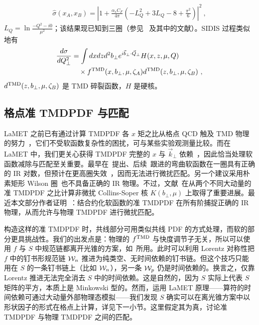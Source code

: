 \begin{align}
	\hat \sigma(x_A,x_B)=\left|1+\frac{\alpha_sC_F}{4\pi}\left(-L^2_{Q}+3L_Q-8+\frac{\pi^2}{6}\right)\right|^2 \ ,
\end{align}
$L_Q=\ln \frac{-Q^2-i0}{\mu^2}$；该结果现已知到三圈（参见~\cite{Moch:2005tm,Baikov:2009bg,Lee:2010cga,Gehrmann:2010ue} 及其中的文献）。SIDIS 过程类似地有
\begin{align}
	\frac{d\sigma}{dQ_\perp^2}&=\int dxdz d^2b_\perp e^{i\vec{b}_\perp \cdot \vec{Q}_\perp}H(x,z,\mu,Q)\nonumber \\
	&\quad \times f^{\rm TMD}(x,b_\perp,\mu,\zeta_A)d^{\rm TMD}(z,b_\perp,\mu,\zeta_B) \ ,
\end{align}
$d^{\rm TMD}(z,b_\perp,\mu,\zeta_B)$ 是 TMD 碎裂函数，$H$ 是硬核。



\subsection{格点准 TMDPDF 与匹配}
\label{sec:quasitmd}
LaMET 之前已有通过计算 TMDPDF 各 $x$ 矩之比从格点 QCD 触及 TMD 物理的努力~\cite{Hagler:2009mb,Musch:2010ka,Musch:2011er,Engelhardt:2015xja,Yoon:2017qzo}，它们不受软函数复杂性的困扰，可与某些实验观测量比较。而在 LaMET 中，我们更关心获得 TMDPDF 完整的 $x$ 与 $\vec{k}_\perp$ 依赖~\cite{Ji:2014hxa,Ji:2018hvs,Ebert:2018gzl,Ebert:2019okf,Ji:2019sxk,Ji:2019ewn}，因此恰当处理软函数减除与匹配至关重要。最早在~\cite{Ji:2014hxa}提出、后续~\cite{Ebert:2019okf}跟进的弯曲软函数在一圈具有正确的 IR 对数，但预计在更高圈失效~\cite{Ji:2019sxk}，因而无法进行微扰匹配。另一个建议采用朴素矩形 Wilson 圈~\cite{Ji:2018hvs,Ebert:2019okf}也不具备正确的 IR 物理。不过，文献~\cite{Ebert:2018gzl}在从两个不同大动量的准 TMDPDF 之比计算非微扰 Collins-Soper 核 $K(b_\perp,\mu)$ 上取得了重要进展。最近本文部分作者证明~\cite{Ji:2019sxk,Ji:2019ewn}：结合约化软函数的准 TMDPDF 在所有阶捕捉正确的 IR 物理，从而允许与物理 TMDPDF 进行微扰匹配。

构造这样的准 TMDPDF 时，共线部分可用类似共线 PDF 的方式处理，而软的部分更具挑战性。我们的出发点是：物理的 $f^{\rm TMD}$ 与快度调节子无关，所以可以使用 $f$ 与 $S$ 中规范链都离开光锥的方案，如~\cite{Collins:2011zzd}所用。此时可以利用 Lorentz 对称性把 $f$ 中的钉书形规范链 ${\cal W}_n$ 推进为纯类空、无时间依赖的钉书链。但这个技巧只能用在 $S$ 的一条钉书链上（比如 ${\cal W}_n$），另一条 ${\cal W}_p$ 仍是时间依赖的。换言之，仅靠 Lorentz 推进无法完全消去 $S$ 中的时间依赖。这是自然的，因为 $S$ 实际上代表 $S$ 矩阵的平方，本质上是 Minkowski 型的。然而，运用 LaMET 原理——算符的时间依赖可通过大动量外部物理态模拟——我们发现 $S$ 确实可以在离光锥方案中以形状因子的形式在格点上计算，详见下一小节。这里假定其为真，讨论准 TMDPDF 与物理 TMDPDF 之间的匹配。

